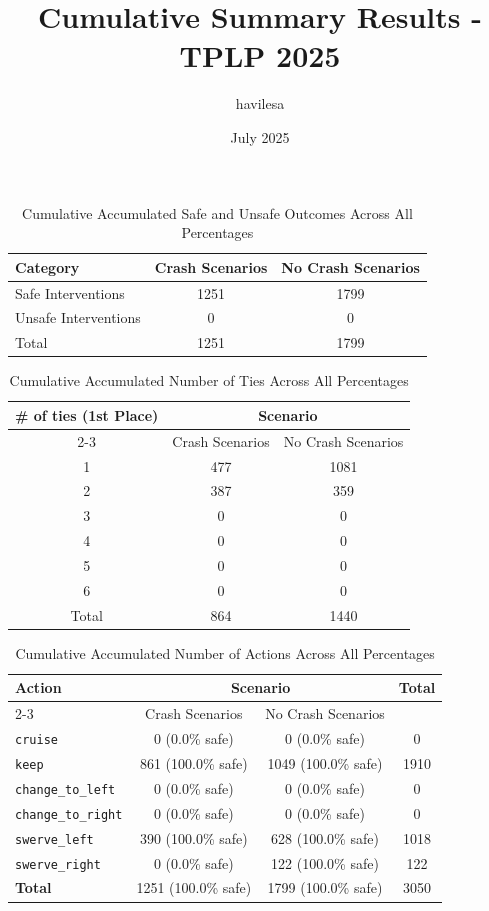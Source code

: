 \documentclass{article}
\title{Cumulative Summary Results - TPLP 2025}
\author{havilesa}
\date{July 2025}
\begin{document}
\maketitle

\begin{table}[h]
\centering
\caption{Cumulative Accumulated Safe and Unsafe Outcomes Across All Percentages}
\begin{tabular}{l|cc}
\toprule
Category & Crash Scenarios & No Crash Scenarios \\
\midrule
Safe Interventions & 1251 & 1799 \\ 
Unsafe Interventions & 0 & 0 \\ 
\midrule
Total & 1251 & 1799 \\ 
\bottomrule
\end{tabular}
\end{table}

\begin{table}[h]
\centering
\caption{Cumulative Accumulated Number of Ties Across All Percentages}
\begin{tabular}{c|cc}
\toprule
\multirow{2}{*}{\# of ties (1st Place)} & \multicolumn{2}{c|}{Scenario} \\
\cmidrule{2-3}
 & Crash Scenarios & No Crash Scenarios \\
\midrule
1 & 477 & 1081 \\ 
2 & 387 & 359 \\ 
3 & 0 & 0 \\ 
4 & 0 & 0 \\ 
5 & 0 & 0 \\ 
6 & 0 & 0 \\ 
\midrule
Total & 864 & 1440 \\ 
\bottomrule
\end{tabular}
\end{table}

\begin{table}[h]
\centering
\caption{Cumulative Accumulated Number of Actions Across All Percentages}
\begin{tabular}{l|cc|c}
\toprule
\multirow{2}{*}{Action} & \multicolumn{2}{c|}{Scenario} & \multirow{2}{*}{Total} \\
\cmidrule{2-3}
 & Crash Scenarios & No Crash Scenarios \\
\midrule
\texttt{cruise} & 0 (0.0\% safe) & 0 (0.0\% safe) & 0 \\ 
\texttt{keep} & 861 (100.0\% safe) & 1049 (100.0\% safe) & 1910 \\ 
\texttt{change\_to\_left} & 0 (0.0\% safe) & 0 (0.0\% safe) & 0 \\ 
\texttt{change\_to\_right} & 0 (0.0\% safe) & 0 (0.0\% safe) & 0 \\ 
\texttt{swerve\_left} & 390 (100.0\% safe) & 628 (100.0\% safe) & 1018 \\ 
\texttt{swerve\_right} & 0 (0.0\% safe) & 122 (100.0\% safe) & 122 \\ 
\midrule
\textbf{Total} & 1251 (100.0\% safe) & 1799 (100.0\% safe) & 3050 \\ 
\bottomrule
\end{tabular}
\end{table}
\end{document}
